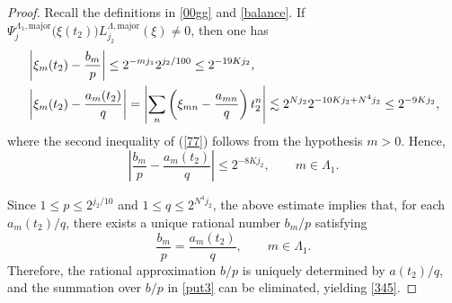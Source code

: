 \documentclass[10pt,a4paper]{amsart}
\numberwithin{equation}{section}
\begin{document}
\begin{proof}
Recall the definitions in \eqref{00gg} and \eqref{balance}. If $\Psi^{\Lambda_1,\mathrm{major}}_{j}\bigl(\xi(t_2)\bigr)
L^{\Lambda,\mathrm{major}}_{j_2}(\xi)\neq 0$, then one has
\begin{align}
&\left|
\xi_m(t_2)-\frac{b_m}{p}
\right|
\le
2^{-mj_1}2^{j_2/100}
\le
2^{-19Kj_2},\label{77}
\\
&\left|
\xi_m(t_2)-\frac{a_m(t_2)}{q}
\right|
=
\left|
\sum_n
\left(
\xi_{mn}-\frac{a_{mn}}{q}
\right)
t_2^n
\right|
\lesssim
2^{Nj_2}
2^{-10Kj_2+N^4j_2}
\le
2^{-9Kj_2},\notag
\end{align}
where the second inequality of (\ref{77}) follows from the hypothesis $m>0$.
Hence,
\[
\left|
\frac{b_m}{p}
-
\frac{a_m(t_2)}{q}
\right|
\le
2^{-8Kj_2},
\qquad
m\in\Lambda_1.
\]

Since
$1\le p\le2^{j_2/10}$
and
$1\le q\le2^{N^4j_2}$,
the above estimate implies that, for each
$a_m(t_2)/q$, there exists a unique rational number
$b_m/p$ satisfying
\begin{equation}
\frac{b_m}{p}
=
\frac{a_m(t_2)}{q},
\qquad
m\in\Lambda_1.
\end{equation}
Therefore, the rational approximation $b/p$ is uniquely determined by
$a(t_2)/q$, and the summation over $b/p$ in
\eqref{put3} can be eliminated, yielding
\eqref{345}.
\end{proof}
\end{document}
